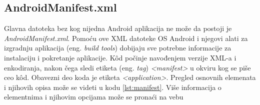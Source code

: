 \documentclass[android.tex]{subfiles}
\begin{document}
\subsection{AndroidManifest.xml}
\label{sec:manifest}
Glavna datoteka bez kog nijedna Android aplikacija ne može da postoji je \textit{AndroidManifest.xml}. Pomoću ove XML datoteke OS Android i njegovi alati za izgradnju aplikacija (eng. \textit{build tools}) dobijaju sve potrebne informacije za instalaciju i pokretanje aplikacije. K\^{o}d počinje navođenjem verzije XML-a i enkodiranja, nakon čega sledi etiketa (eng. \textit{tag}) \textit{<manifest>} u okviru kog se piše ceo k\^{o}d. Obavezni deo koda je etiketa \textit{<application>}. Pregled osnovnih elemenata i njihovih opisa može se videti u kodu \ref{lst:manifest}. Više informacija o elementnima i njihovim opcijama može se pronaći na vebu \cite{sajt:manifest}


\end{document}
